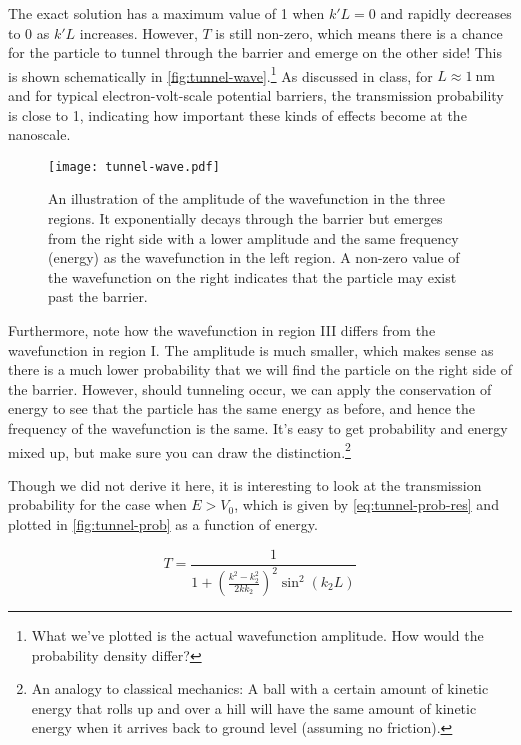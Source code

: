 The exact solution has a maximum value of 1 when $k'L = 0$ and rapidly decreases to 0 as $k'L$ increases. 
However, $T$ is still non-zero, which means there is a chance for the particle to tunnel through the barrier and emerge on the other side! 
This is shown schematically in \autoref{fig:tunnel-wave}.\footnote{What we've plotted is the actual wavefunction amplitude. How would the probability density differ?} 
As discussed in class, for $L \approx \SI{1}{\nano\meter}$ and for typical electron-volt-scale potential barriers, the transmission probability is close to 1, indicating how important these kinds of effects become at the nanoscale.

\begin{figure}[!h]
	\centering
	\texttt{[image: tunnel-wave.pdf]}
	\caption{An illustration of the amplitude of the wavefunction in the three regions. 
	It exponentially decays through the barrier but emerges from the right side with a lower amplitude and the same frequency (energy) as the wavefunction in the left region. 
	A non-zero value of the wavefunction on the right indicates that the particle may exist past the barrier.}
	\label{fig:tunnel-wave}
\end{figure}

Furthermore, note how the wavefunction in region III differs from the wavefunction in region I. 
The amplitude is much smaller, which makes sense as there is a much lower probability that we will find the particle on the right side of the barrier. 
However, should tunneling occur, we can apply the conservation of energy to see that the particle has the same energy as before, and hence the frequency of the wavefunction is the same. 
It's easy to get probability and energy mixed up, but make sure you can draw the distinction.\footnote{An analogy to classical mechanics: A ball with a certain amount of kinetic energy that rolls up and over a hill will have the same amount of kinetic energy when it arrives back to ground level (assuming no friction).} 

Though we did not derive it here, it is interesting to look at the transmission probability for the case when $E > V_0$, which is given by \autoref{eq:tunnel-prob-res} and plotted in \autoref{fig:tunnel-prob} as a function of energy.

\begin{equation}
	\boxed{T = \frac{1}{1 + \left(\frac{k^2-k_2^2}{2kk_2}\right)^2 \sin^2(k_2L)}} \label{eq:tunnel-prob-res}
\end{equation}

